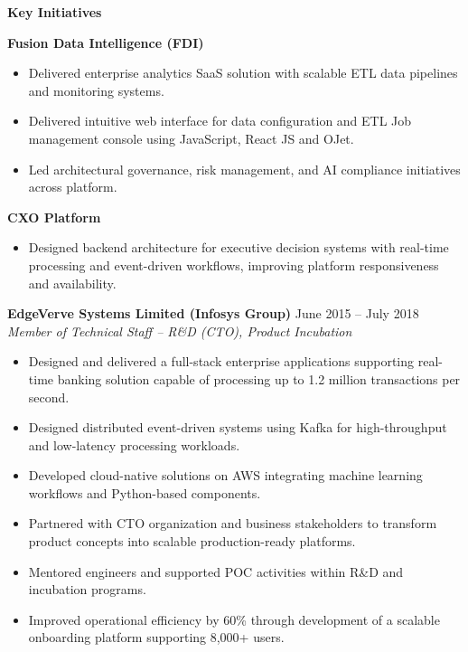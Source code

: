 \documentclass[11pt,a4paper]{article}
\begin{document}
\textbf{Key Initiatives}

\textbf{Fusion Data Intelligence (FDI)}
\begin{itemize}
    \item Delivered enterprise analytics SaaS solution with scalable ETL data pipelines and monitoring systems.
    \item Delivered intuitive web interface for data configuration and ETL Job management console using JavaScript, React JS and OJet.
    \item Led architectural governance, risk management, and AI compliance initiatives across platform.
\end{itemize}

\textbf{CXO Platform}
\begin{itemize}
    \item Designed backend architecture for executive decision systems with real-time processing and event-driven workflows, improving platform responsiveness and availability.
\end{itemize}

\vspace{4pt}

\textbf{EdgeVerve Systems Limited (Infosys Group)} \hfill June 2015 -- July 2018 \\
\textit{Member of Technical Staff -- R\&D (CTO), Product Incubation}

\begin{itemize}
    \item Designed and delivered a full-stack enterprise applications supporting real-time banking solution capable of processing up to 1.2 million transactions per second.
    
    \item Designed distributed event-driven systems using Kafka for high-throughput and low-latency processing workloads.
    
    \item Developed cloud-native solutions on AWS integrating machine learning workflows and Python-based components.
    
    \item Partnered with CTO organization and business stakeholders to transform product concepts into scalable production-ready platforms.
    
    \item Mentored engineers and supported POC activities within R\&D and incubation programs.
    
    \item Improved operational efficiency by 60\% through development of a scalable onboarding platform supporting 8,000+ users.
\end{itemize}
\end{document}
